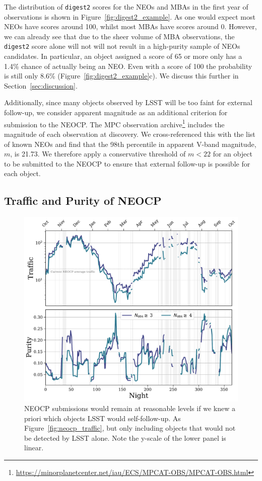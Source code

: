 \documentclass[twocolumn]{aastex631}
\newcommand{\dig}{\texttt{digest2}}
\begin{document}
The distribution of \dig{} scores for the NEOs and MBAs in the first year of observations is shown in Figure~\ref{fig:digest2_example}. As one would expect most NEOs have scores around 100, whilst most MBAs have scores around 0. However, we can already see that due to the sheer volume of MBA observations, the \dig{} score alone will not will not result in a high-purity sample of NEOs candidates. In particular, an object assigned a score of 65 or more only has a 1.4\% chance of actually being an NEO. Even with a score of 100 the probability is still only 8.6\% (Figure~\ref{fig:digest2_example}c). We discuss this further in Section~\ref{sec:discussion}.

Additionally, since many objects observed by LSST will be too faint for external follow-up, we consider apparent magnitude as an additional criterion for submission to the NEOCP. The MPC observation archive\footnote{\url{https://minorplanetcenter.net/iau/ECS/MPCAT-OBS/MPCAT-OBS.html}} includes the magnitude of each observation at discovery. We cross-referenced this with the list of known NEOs and find that the 98th percentile in apparent V-band magnitude, $m$, is 21.73. We therefore apply a conservative threshold of $m < 22$ for an object to be submitted to the NEOCP to ensure that external follow-up is possible for each object.

\subsection{Traffic and Purity of NEOCP}\label{sec:traffic_basic}

\begin{figure}
    \centering
    \includegraphics[width=\textwidth]{traffic_purity_unfindable.pdf}
    \caption{NEOCP submissions would remain at reasonable levels if we knew a priori which objects LSST would self-follow-up. As Figure~\ref{fig:neocp_traffic}, but only including objects that would not be detected by LSST alone. Note the y-scale of the lower panel is linear.}
    \label{fig:neocp_traffic_unfindable}
\end{figure}
\end{document}
